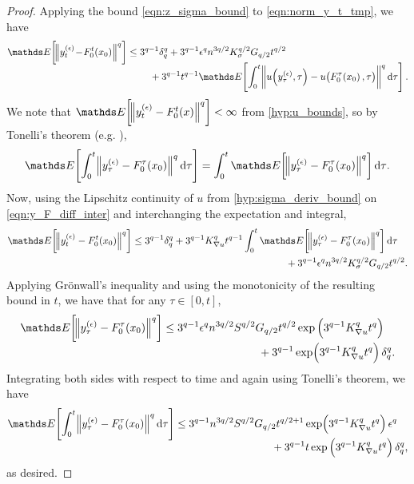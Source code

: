 \begin{proof}
	Applying the bound \cref{eqn:z_sigma_bound} to \cref{eqn:norm_y_t_tmp}, we have
	\begin{equation}\label{eqn:y_F_diff_inter}
		\avg{\norm{y_t^{(\epsilon)}\!-\!F_0^t\!\left(x_0\right)}^q} \leq \begin{multlined}[t]
			3^{q-1}\delta_q^q + 3^{q-1}\epsilon^q n^{3q/2}K_{\sigma}^{q/2} G_{q/2} t^{q/2} \\
			+ 3^{q-1}t^{q-1}\avg{\int_0^{t}{\norm{u\!\left(y_\tau^{(\epsilon)}, \tau\right) - u\!\left(F_0^{\tau}\!\left(x_0\right), \tau\right)}}^q\dif\tau}.
		\end{multlined}
	\end{equation}
	We note that \(\avg{\norm{y_t^{(\epsilon)} - F_0^t\!\left(x\right)}^q} < \infty\) from \ref{hyp:u_bounds}, so by Tonelli's theorem (e.g. \cite[Thm. 2.3.9]{Bremaud_2020_ProbabilityTheoryStochastic}),
	\begin{equation*}
		\avg{\int_0^{t}{\norm{y_\tau^{(\epsilon)} - F_0^\tau\!\left(x_0\right)}^q\dif\tau}} = \int_0^{t}{\avg{\norm{y_\tau^{(\epsilon)} - F_0^\tau\!\left(x_0\right)}^q}\dif\tau}.
		\label{eqn:y_tonelli}
	\end{equation*}
	Now, using the Lipschitz continuity of \(u \) from \ref{hyp:sigma_deriv_bound} on \cref{eqn:y_F_diff_inter} and interchanging the expectation and integral,
	\[
		\avg{\norm{y_t^{(\epsilon)} - F_0^t\!\left(x_0\right)}^q} \leq \begin{multlined}[t]
			3^{q-1}\delta_q^q + 3^{q-1} K_{\nabla u}^q t^{q-1} \int_0^{t}{\avg{\norm{y_\tau^{(\epsilon)} - F_0^{\tau}\!\left(x_0\right)}^q}\dif\tau} \\
			+ 3^{q-1}\epsilon^q n^{3q/2}K_{\sigma}^{q/2} G_{q/2} t^{q/2}.
		\end{multlined}
	\]
	Applying Gr\"{o}nwall's inequality and using the monotonicity of the resulting bound in \(t\), we have that for any \(\tau \in [0,t]\),
	\[
		\avg{\norm{y_\tau^{(\epsilon)} - F_0^\tau\!\left(x_0\right)}^q}  \leq \begin{multlined}[t]
			3^{q-1}\epsilon^q n^{3q/2}S^{q/2} G_{q/2} t^{q/2}\exp\left(3^{q-1} K_{\nabla u}^q t^q\right) \\
			+ 3^{q-1}\exp\!\left(3^{q-1} K_{\nabla u}^q t^q\right)\delta_q^q .
		\end{multlined}
	\]
	Integrating both sides with respect to time
	and again using Tonelli's theorem, we have
	\begin{align*}
		\avg{\int_0^t{\norm{y_\tau^{(\epsilon)} - F_0^\tau\!\left(x_0\right)}^q\dif\tau}} \leq \begin{multlined}[t]
			                                                                                       3^{q-1}n^{3q/2}S^{q/2} G_{q/2} t^{q/2 + 1}\exp\!\left(3^{q-1} K_{\nabla u}^q t^q\right)\epsilon^q  \\
			                                                                                       + 3^{q-1}t\exp\left(3^{q-1} K_{\nabla u}^q t^q\right)\delta_q^q ,
		                                                                                       \end{multlined}
	\end{align*}
	as desired.
\end{proof}

